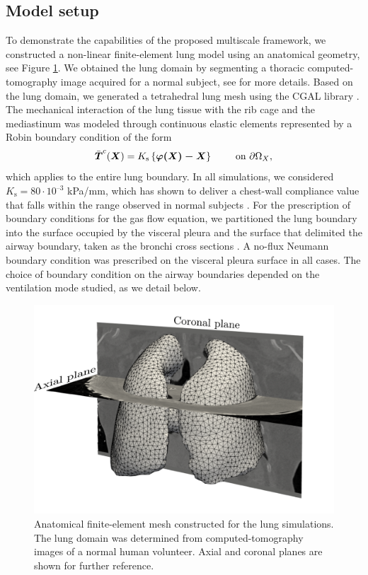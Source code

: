 \documentclass[preprint,3p,12pt,number,sort&compress]{elsarticle}
\def\vec   #1{\text{\boldmath $#1$}{}}
\begin{document}
\subsection{Model setup}
To demonstrate the capabilities of the proposed multiscale framework, we constructed a non-linear finite-element lung model using an anatomical geometry, see Figure \ref{fig:lung-mesh}. We obtained the lung domain by segmenting a thoracic computed-tomography image acquired for a normal subject, see \cite{HurtadoEtal2016,HurtadoEtal2017} for more details. Based on the lung domain, we generated a tetrahedral lung mesh using the CGAL library \cite{cgal}. The mechanical interaction of the lung tissue with the rib cage and the mediastinum was modeled through continuous elastic elements represented by a Robin boundary condition of the form
	 \begin{equation}
	     \bar{\vec{T}}^c(\vec X)={K}_\text{s} \left\{\vec{\varphi(\vec X) -X} \right\} \qquad \text{ on } \partial \Omega_X,
	 \end{equation}
which applies to the entire lung boundary. In all simulations, we considered ${K}_\text{s}=80\cdot 10^{–3}$ kPa/mm, which has shown to deliver a chest-wall compliance value that falls within the range observed in normal subjects \cite{avileshurtado2022whole}. For the prescription of boundary conditions for the gas flow equation, we partitioned the lung boundary into the surface occupied by the visceral pleura and the surface that delimited the airway boundary, taken as the bronchi cross sections \cite{avileshurtado2022whole}. A no-flux Neumann boundary condition was prescribed on the visceral pleura surface in all cases. The choice of boundary condition on the airway boundaries depended on the ventilation mode studied, as we detail below.\\

\begin{figure}[h!]
    \begin{center}
    \includegraphics[width=0.7 \textwidth]{./Figures/mesh2.pdf}
    \caption[]{Anatomical finite-element mesh constructed for the lung simulations. The lung domain was determined from computed-tomography images of a normal human volunteer. Axial and coronal planes are shown for further reference.}
    \label{fig:lung-mesh}
    \end{center}
\end{figure}
\end{document}
